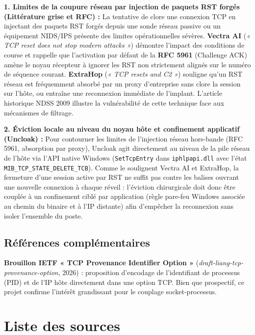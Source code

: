 \documentclass[10pt,a4paper]{article}
\begin{document}
\textbf{1. Limites de la coupure réseau par injection de paquets RST forgés (Littérature grise et RFC) :}\newline
La tentative de clore une connexion TCP en injectant des paquets RST forgés depuis une sonde réseau passive ou un équipement NIDS/IPS présente des limites opérationnelles sévères. \textbf{Vectra AI} (\textit{« TCP reset does not stop modern attacks »}) démontre l'impact des conditions de course et rappelle que l'activation par défaut de la \textbf{RFC 5961} (Challenge ACK) amène le noyau récepteur à ignorer les RST non strictement alignés sur le numéro de séquence courant. \textbf{ExtraHop} (\textit{« TCP resets and C2 »}) souligne qu'un RST réseau est fréquemment absorbé par un proxy d'entreprise sans clore la session sur l'hôte, ou entraîne une reconnexion immédiate de l'implant. L'article historique NDSS 2009 illustre la vulnérabilité de cette technique face aux mécanismes de filtrage.

\textbf{2. Éviction locale au niveau du noyau hôte et confinement applicatif (Uncloak) :}\newline
Pour contourner les limites de l'injection réseau hors-bande (RFC 5961, absorption par proxy), Uncloak agit directement au niveau de la pile réseau de l'hôte via l'API native Windows (\texttt{SetTcpEntry} dans \texttt{iphlpapi.dll} avec l'état \texttt{MIB\_TCP\_STATE\_DELETE\_TCB}). Comme le soulignent Vectra AI et ExtraHop, la fermeture d'une session active par RST ne suffit pas contre les balises ouvrant une nouvelle connexion à chaque réveil : l'éviction chirurgicale doit donc être couplée à un confinement ciblé par application (règle pare-feu Windows associée au chemin du binaire et à l'IP distante) afin d'empêcher la reconnexion sans isoler l'ensemble du poste.

\vspace{1mm}
\subsection*{Références complémentaires}
\textbf{Brouillon IETF « TCP Provenance Identifier Option »} (\textit{draft-liang-tcp-provenance-option}, 2026) : proposition d'encodage de l'identifiant de processus (PID) et de l'IP hôte directement dans une option TCP. Bien que prospectif, ce projet confirme l'intérêt grandissant pour le couplage socket-processus.

\newpage

\section*{Liste des sources}
\end{document}
